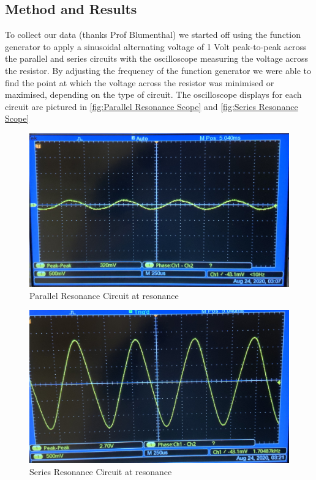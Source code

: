 \documentclass[12pt]{article}
\numberwithin{equation}{section}
\numberwithin{figure}{section}
\begin{document}
    \subsection{Method and Results}\label{sec:Method and Results}
    To collect our data (thanks Prof Blumenthal) we started off using the function generator to apply 
    a sinusoidal alternating voltage of 1 Volt peak-to-peak across the parallel and series circuits 
    with the oscilloscope 
    measuring the voltage across the resistor. By adjusting the frequency of the function generator 
    we were able to find the point at which the voltage across the resistor was minimised or maximised, 
    depending on the type of circuit. The oscilloscope displays for each circuit are pictured 
    in \autoref{fig:Parallel Resonance Scope} and \autoref{fig:Series Resonance Scope}
    \begin{figure}[h]
        \begin{center}
           \includegraphics[width=.65\textwidth]{Parallel_Resonance_Scope.jpg}
           \caption{Parallel Resonance Circuit at resonance}
           \label{fig:Parallel Resonance Scope}
        \end{center}
    \end{figure}
    \begin{figure}[h]
        \begin{center}
           \includegraphics[width=.65\textwidth]{Series_Resonance_Scope.jpg}
           \caption{Series Resonance Circuit at resonance}
           \label{fig:Series Resonance Scope}
        \end{center}
    \end{figure}
\end{document}
